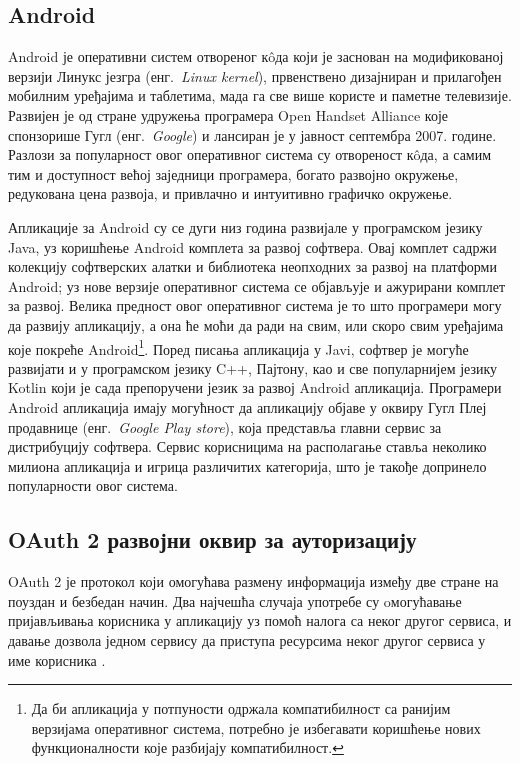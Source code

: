\documentclass[12pt,oneside]{memoir}
\begin{document}
\subsection{Android}
Android\cite{Android} је оперативни систем отвореног кôда који је заснован на модификованој верзији Линукс језгра (енг.~\textit{Linux kernel}), првенствено дизајниран и прилагођен мобилним уређајима и таблетима, мада га све више користе и паметне телевизије. Развијен је од стране удружења програмера Open Handset Alliance које спонзорише Гугл (енг.~\textit{Google}) и лансиран је у јавност септембра 2007. године. Разлози за популарност овог оперативног система су отвореност кôда, а самим тим и доступност већој заједници програмера, богато развојно окружење, редукована цена развоја, и привлачно и интуитивно графичко окружење.

Апликације за Android су се дуги низ година развијале у програмском језику Java, уз коришћење Android комплета за развој софтвера. Овај комплет садржи колекцију софтверских алатки и библиотека неопходних за развој на платформи Android; уз нове верзије оперативног система се објављује и ажурирани комплет за развој. Велика предност овог оперативног система је то што програмери могу да развију апликацију, а она ће моћи да ради на свим, или скоро свим уређајима које покреће Android\footnote{Да би апликација у потпуности одржала компатибилност са ранијим верзијама оперативног система, потребно је избегавати коришћење нових функционалности које разбијају компатибилност.}. Поред писања апликација у Javi, софтвер је могуће развијати и у програмском језику C++, Пајтону, као и све популарнијем језику Kotlin који је сада препоручени језик за развој Android апликација. Програмери Android апликација имају могућност да апликацију објаве у оквиру Гугл Плеј продавнице (енг.~\textit{Google Play store}), која представља главни сервис за дистрибуцију софтвера. Сервис корисницима на располагање ставља неколико милиона апликација и игрица различитих категорија, што је такође допринело популарности овог система.

\subsection{OAuth 2 развојни оквир за ауторизацију}
OAuth 2 је протокол који омогућава размену информација између две стране на поуздан и безбедан начин. Два најчешћа случаја употребе су oмогућавање пријављивања корисника у апликацију уз помоћ налога са неког другог сервиса, и давање дозвола једном сервису да приступа ресурсима неког другог сервиса у име корисника \cite{MasteringOAuth2}.
\end{document}

